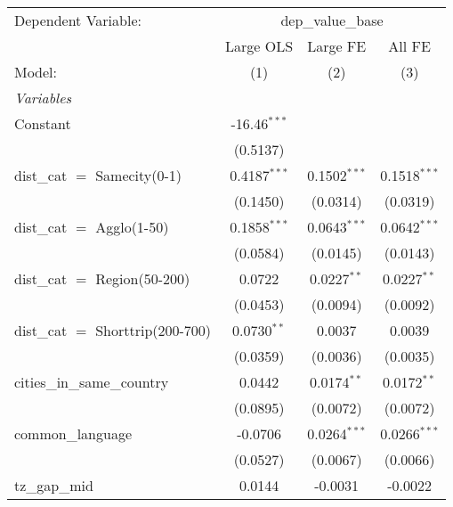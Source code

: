 
\begingroup
\centering
\begin{tabular}{lccc}
   \tabularnewline \midrule \midrule
   Dependent Variable: & \multicolumn{3}{c}{dep\_value\_base}\\
                                                  & Large OLS      & Large FE        & All FE \\   
   Model:                                         & (1)            & (2)             & (3)\\  
   \midrule
   \emph{Variables}\\
   Constant                                       & -16.46$^{***}$ &                 &   \\   
                                                  & (0.5137)       &                 &   \\   
   dist\_cat $=$ Samecity(0-1)                    & 0.4187$^{***}$ & 0.1502$^{***}$  & 0.1518$^{***}$\\   
                                                  & (0.1450)       & (0.0314)        & (0.0319)\\   
   dist\_cat $=$ Agglo(1-50)                      & 0.1858$^{***}$ & 0.0643$^{***}$  & 0.0642$^{***}$\\   
                                                  & (0.0584)       & (0.0145)        & (0.0143)\\   
   dist\_cat $=$ Region(50-200)                   & 0.0722         & 0.0227$^{**}$   & 0.0227$^{**}$\\   
                                                  & (0.0453)       & (0.0094)        & (0.0092)\\   
   dist\_cat $=$ Shorttrip(200-700)               & 0.0730$^{**}$  & 0.0037          & 0.0039\\   
                                                  & (0.0359)       & (0.0036)        & (0.0035)\\   
   cities\_in\_same\_country                      & 0.0442         & 0.0174$^{**}$   & 0.0172$^{**}$\\   
                                                  & (0.0895)       & (0.0072)        & (0.0072)\\   
   common\_language                               & -0.0706        & 0.0264$^{***}$  & 0.0266$^{***}$\\   
                                                  & (0.0527)       & (0.0067)        & (0.0066)\\   
   tz\_gap\_mid                                   & 0.0144         & -0.0031         & -0.0022\\   

\end{tabular}
